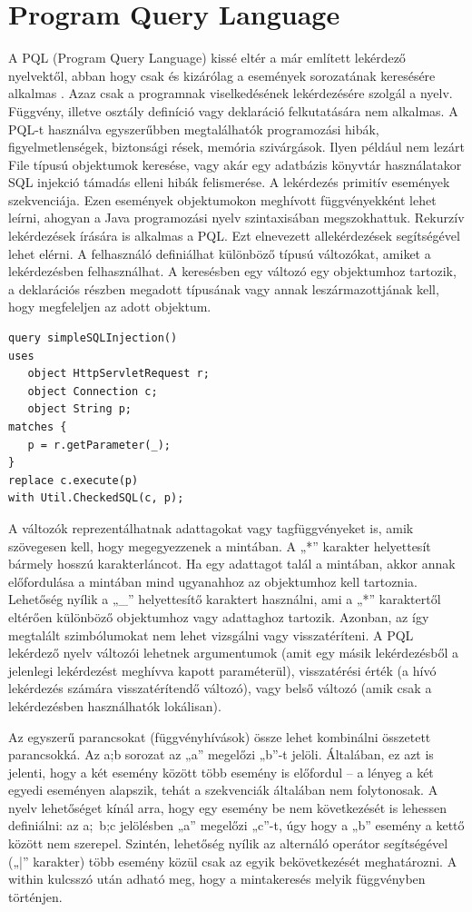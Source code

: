 \documentclass[a4paper,12pt]{report}
\begin{document}
\section{Program Query Language}
\par A PQL (Program Query Language) kissé eltér a már említett lekérdező nyelvektől, abban hogy csak és kizárólag a események sorozatának keresésére alkalmas \cite{pql}. Azaz csak a programnak viselkedésének lekérdezésére szolgál a nyelv. Függvény, illetve osztály definíció vagy deklaráció felkutatására nem alkalmas. A PQL-t használva egyszerűbben megtalálhatók programozási hibák, figyelmetlenségek, biztonsági rések, memória szivárgások. Ilyen például nem lezárt File típusú objektumok keresése, vagy akár egy adatbázis könyvtár használatakor SQL injekció támadás elleni hibák felismerése. A lekérdezés primitív események szekvenciája. Ezen események objektumokon meghívott függvényekként lehet leírni, ahogyan a Java programozási nyelv szintaxisában megszokhattuk. Rekurzív lekérdezések írására is alkalmas a PQL. Ezt elnevezett allekérdezések segítségével lehet elérni. A felhasználó definiálhat különböző típusú változókat, amiket a lekérdezésben felhasználhat. A keresésben egy változó egy objektumhoz tartozik, a deklarációs részben megadott típusának vagy annak leszármazottjának kell, hogy megfeleljen az adott objektum.
\begin{verbatim}
query simpleSQLInjection()
uses
   object HttpServletRequest r;
   object Connection c;
   object String p;
matches { 
   p = r.getParameter(_); 
}
replace c.execute(p)
with Util.CheckedSQL(c, p);
\end{verbatim} 
\par A változók reprezentálhatnak adattagokat vagy tagfüggvényeket is, amik szövegesen kell, hogy megegyezzenek a mintában. A „*” karakter helyettesít bármely hosszú karakterláncot. Ha egy adattagot talál a mintában, akkor annak előfordulása a mintában mind ugyanahhoz az objektumhoz kell tartoznia. Lehetőség nyílik a „\_” helyettesítő karaktert használni, ami a „*” karaktertől eltérően különböző objektumhoz vagy adattaghoz tartozik. Azonban, az így megtalált szimbólumokat nem lehet vizsgálni vagy visszatéríteni. A PQL lekérdező nyelv változói lehetnek argumentumok (amit egy másik lekérdezésből a jelenlegi lekérdezést meghívva kapott paraméterül), visszatérési érték (a hívó lekérdezés számára visszatérítendő változó), vagy belső változó (amik csak a lekérdezésben használhatók lokálisan).
\par Az egyszerű parancsokat (függvényhívások) össze lehet kombinálni összetett parancsokká. Az a;b sorozat az „a” megelőzi „b”-t jelöli. Általában, ez azt is jelenti, hogy a két esemény között több esemény is előfordul – a lényeg a két egyedi eseményen alapszik, tehát a szekvenciák általában nem folytonosak. A nyelv lehetőséget kínál arra, hogy egy esemény be nem következését is lehessen definiálni: az a;~b;c jelölésben „a” megelőzi „c”-t, úgy hogy a „b” esemény a kettő között nem szerepel. Szintén, lehetőség nyílik az alternáló operátor segítségével („|” karakter) több esemény közül csak az egyik bekövetkezését meghatározni. A within kulcsszó után adható meg, hogy a mintakeresés melyik függvényben történjen.
\end{document}
